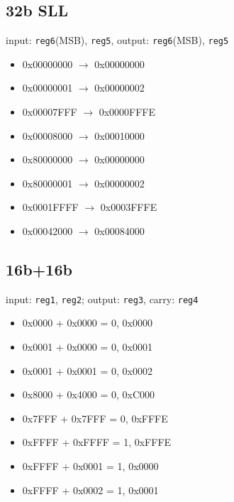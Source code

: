 \documentclass[10pt,a4paper]{article}
\theoremstyle{definition}%
\begin{document}
\subsection{32b SLL}
input: \verb!reg6!(MSB), \verb!reg5!, output: \verb!reg6!(MSB), \verb!reg5!
{\ttfamily
\begin{itemize}
\item 0x00000000 $\longrightarrow$ 0x00000000
\item 0x00000001 $\longrightarrow$ 0x00000002
\item 0x00007FFF $\longrightarrow$ 0x0000FFFE
\item 0x00008000 $\longrightarrow$ 0x00010000
\item 0x80000000 $\longrightarrow$ 0x00000000
\item 0x80000001 $\longrightarrow$ 0x00000002
\item 0x0001FFFF $\longrightarrow$ 0x0003FFFE
\item 0x00042000 $\longrightarrow$ 0x00084000
\end{itemize}}

\subsection{16b+16b}
input: \verb!reg1!, \verb!reg2!; output: \verb!reg3!, carry: \verb!reg4!
{\ttfamily
\begin{itemize}
\item 0x0000 + 0x0000 = 0, 0x0000
\item 0x0001 + 0x0000 = 0, 0x0001
\item 0x0001 + 0x0001 = 0, 0x0002
\item 0x8000 + 0x4000 = 0, 0xC000
\item 0x7FFF + 0x7FFF = 0, 0xFFFE
\item 0xFFFF + 0xFFFF = 1, 0xFFFE
\item 0xFFFF + 0x0001 = 1, 0x0000
\item 0xFFFF + 0x0002 = 1, 0x0001
\end{itemize}}
\end{document}
